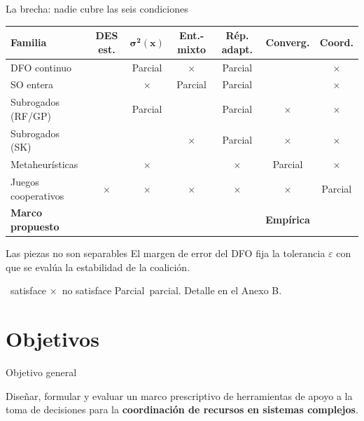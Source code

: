 \documentclass[aspectratio=169,11pt,xcolor=table]{beamer}
\newcommand{\si}{\textcolor{ucgreen}{\checkmark}}
\newcommand{\no}{\textcolor{ucgray}{$\times$}}
\newcommand{\pa}{\textcolor{ucblue}{Parcial}}
\begin{document}
\begin{frame}{La brecha: nadie cubre las seis condiciones}
  \centering\small
  \begin{tabular}{l cccccc}
    \toprule
    \textbf{Familia} & \textbf{DES est.} & $\boldsymbol{\sigma^2(x)}$ & \textbf{Ent.-mixto}
      & \textbf{Rép. adapt.} & \textbf{Converg.} & \textbf{Coord.} \\
    \midrule
    DFO continuo        & \si & \pa & \no & \pa & \si & \no \\
    SO entera           & \si & \no & \pa & \pa & \si & \no \\
    Subrogados (RF/GP)  & \si & \pa & \si & \pa & \no & \no \\
    Subrogados (SK)     & \si & \si & \no & \pa & \no & \no \\
    Metaheurísticas     & \si & \no & \si & \no & \pa & \no \\
    Juegos cooperativos & \no & \no & \no & \no & \no & \pa \\
    \midrule
    \rowcolor{uclight}
    \textbf{Marco propuesto} & \si & \si & \si & \si & \textbf{Empírica} & \si \\
    \bottomrule
  \end{tabular}

  \vspace{1em}
  \begin{alertblock}{Las piezas no son separables}
    El margen de error del DFO fija la tolerancia $\varepsilon$ con que se evalúa la
    estabilidad de la coalición.
  \end{alertblock}
  {\scriptsize \si\ satisface \quad \no\ no satisface \quad \pa\ parcial. Detalle en el Anexo B.}
\end{frame}

\section{Objetivos}

\begin{frame}{Objetivo general}
  \vfill
  \begin{center}
    \Large Diseñar, formular y evaluar un marco prescriptivo de herramientas de apoyo
    a la toma de decisiones para la \textcolor{ucblue}{\textbf{coordinación de
    recursos en sistemas complejos}}.
  \end{center}
  \vfill
\end{frame}
\end{document}
